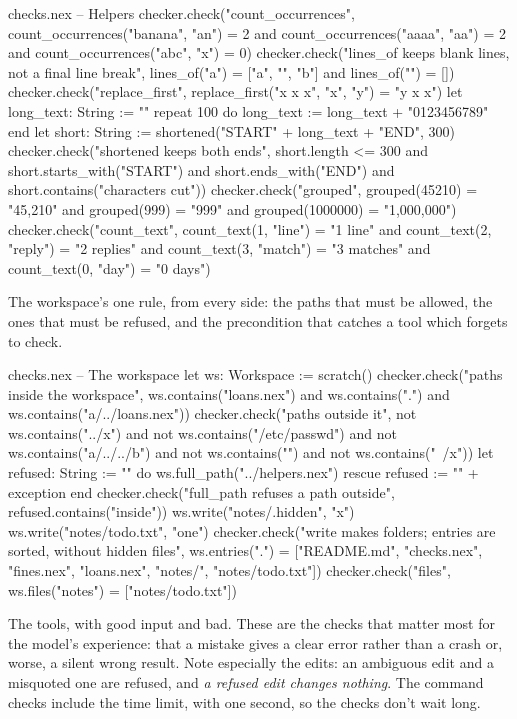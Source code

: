 \begin{continued}{checks.nex}
-- Helpers
checker.check("count_occurrences", count_occurrences("banana", "an") = 2
  and count_occurrences("aaaa", "aa") = 2 and count_occurrences("abc", "x") = 0)
checker.check("lines_of keeps blank lines, not a final line break",
  lines_of("a\n\nb\n") = ["a", "", "b"] and lines_of("") = [])
checker.check("replace_first", replace_first("x x x", "x", "y") = "y x x")
let long_text: String := ""
repeat 100 do
  long_text := long_text + "0123456789"
end
let short: String := shortened("START" + long_text + "END", 300)
checker.check("shortened keeps both ends", short.length <= 300
  and short.starts_with("START") and short.ends_with("END") and short.contains("characters cut"))
checker.check("grouped", grouped(45210) = "45,210" and grouped(999) = "999"
  and grouped(1000000) = "1,000,000")
checker.check("count_text", count_text(1, "line") = "1 line" and count_text(2, "reply") = "2 replies"
  and count_text(3, "match") = "3 matches" and count_text(0, "day") = "0 days")
\end{continued}

The workspace's one rule, from every side: the paths that must be
allowed, the ones that must be refused, and the precondition that catches
a tool which forgets to check.

\begin{continued}{checks.nex}
-- The workspace
let ws: Workspace := scratch()
checker.check("paths inside the workspace", ws.contains("loans.nex") and ws.contains(".")
  and ws.contains("a/../loans.nex"))
checker.check("paths outside it", not ws.contains("../x") and not ws.contains("/etc/passwd")
  and not ws.contains("a/../../b") and not ws.contains("") and not ws.contains("~/x"))
let refused: String := ""
do
  ws.full_path("../helpers.nex")
rescue
  refused := "" + exception
end
checker.check("full_path refuses a path outside", refused.contains("inside"))
ws.write("notes/.hidden", "x")
ws.write("notes/todo.txt", "one\n")
checker.check("write makes folders; entries are sorted, without hidden files",
  ws.entries(".") = ["README.md", "checks.nex", "fines.nex", "loans.nex", "notes/", "notes/todo.txt"])
checker.check("files", ws.files("notes") = ["notes/todo.txt"])
\end{continued}

The tools, with good input and bad. These are the checks that matter
most for the model's experience: that a mistake gives a clear error rather
than a crash or, worse, a silent wrong result. Note especially the edits:
an ambiguous edit and a misquoted one are refused, and \emph{a refused edit
changes nothing}. The command checks include the time limit, with one
second, so the checks don't wait long.

